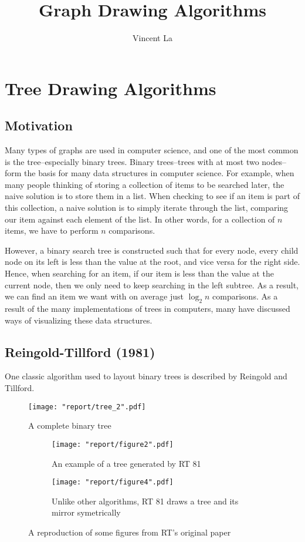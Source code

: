 \documentclass[11pt]{report}
\title{Graph Drawing Algorithms}
\author{Vincent La}
\begin{document}
    
\maketitle
\tableofcontents

\chapter{Tree Drawing Algorithms}
\section{Motivation}
Many types of graphs are used in computer science, and one of the most common is the tree--especially binary trees. Binary trees--trees with at most two nodes--form the basis for many data structures in computer science. For example, when many people thinking of storing a collection of items to be searched later, the naive solution is to store them in a list. When checking to see if an item is part of this collection, a naive solution is to simply iterate through the list, comparing our item against each element of the list. In other words, for a collection of $n$ items, we have to perform $n$ comparisons.

\bigskip

However, a binary search tree is constructed such that for every node, every child node on its left is less than the value at the root, and vice versa for the right side. Hence, when searching for an item, if our item is less than the value at the current node, then we only need to keep searching in the left subtree. As a result, we can find an item we want with on average just $\log_2{n}$ comparisons. As a result of the many implementations of trees in computers, many have discussed ways of visualizing these data structures.

\iffalse
\section{Reingold-Tillford (1981)}
One classic algorithm used to layout binary trees is described by Reingold and Tillford. 

\begin{figure}[H]
    \texttt{[image: "report/tree\_2".pdf]}
    \caption{A complete binary tree}
\end{figure}

\begin{figure}[H]
    \centering
    \begin{subfigure}{.5\textwidth}
        \centering
        \texttt{[image: "report/figure2".pdf]}
        \caption{An example of a tree generated by RT 81}
        \label{fig:fig2}
    \end{subfigure}%
    \begin{subfigure}{.5\textwidth}
        \centering
        \texttt{[image: "report/figure4".pdf]}
        \caption{Unlike other algorithms, RT 81 draws a tree and its mirror symetrically}
    \end{subfigure}%
    
    \caption{A reproduction of some figures from RT's original paper}
\end{figure}
\end{document}
